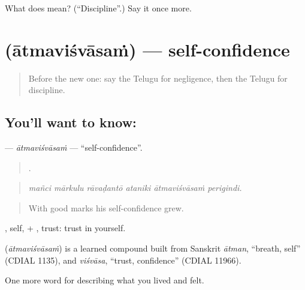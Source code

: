 \begin{tcolorbox}[breakable,colback=teal!4,colframe=teal!35!black,title={Before you move on}]
What does  mean? (\textquotedblleft{}Discipline\textquotedblright{}.) Say it once more.
\end{tcolorbox}
\section[\texorpdfstring{\te{ఆత్మవిశ్వాసం} (ātmaviśvāsaṁ)}{ఆత్మవిశ్వాసం (ātmaviśvāsaṁ)}]{ (ātmaviśvāsaṁ) — self-confidence}

\label{lesson:TE-C510-atmavisvasam}



\begin{quote}
Before the new one: say the Telugu for negligence, then the Telugu for discipline.
\end{quote}

\subsection*{You'll want to know: }
\textbf{} — \emph{ātmaviśvāsaṁ} — \textquotedblleft{}self-confidence\textquotedblright{}.

\begin{quote}
     .
\end{quote}

\begin{quote}
\emph{mañci mārkulu rāvaḍantō ataniki ātmaviśvāsaṁ perigindi.}
\end{quote}

\begin{quote}
With good marks his self-confidence grew.
\end{quote}

, self, + , trust: trust in yourself.

\begin{cousinweb}
\textbf{} (\emph{ātmaviśvāsaṁ}) is a learned compound built from Sanskrit \emph{ātman}, \textquotedblleft{}breath, self\textquotedblright{} (CDIAL 1135), and \emph{viśvāsa}, \textquotedblleft{}trust, confidence\textquotedblright{} (CDIAL 11966).
\end{cousinweb}

\begin{grammarlens}[title={What you've built}]
One more word for describing what you lived and felt.
\end{grammarlens}

